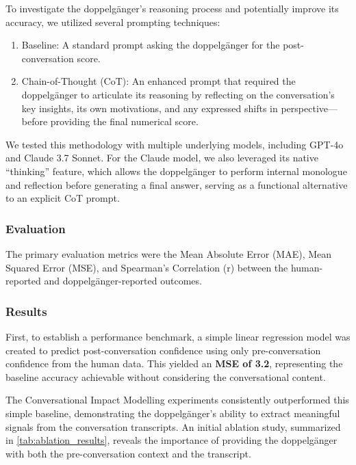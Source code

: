 To investigate the doppelgänger's reasoning process and potentially improve its accuracy, we utilized several prompting techniques:

\begin{enumerate}
\item Baseline: A standard prompt asking the doppelgänger for the post-conversation score.

\item Chain-of-Thought (CoT): An enhanced prompt that required the doppelgänger to articulate its reasoning by reflecting on the conversation's key insights, its own motivations, and any expressed shifts in perspective—before providing the final numerical score.
\end{enumerate}

We tested this methodology with multiple underlying models, including GPT-4o and Claude 3.7 Sonnet. For the Claude model, we also leveraged its native ``thinking'' feature, which allows the doppelgänger to perform internal monologue and reflection before generating a final answer, serving as a functional alternative to an explicit CoT prompt.

\subsubsection{Evaluation}
The primary evaluation metrics were the Mean Absolute Error (MAE), Mean Squared Error (MSE), and Spearman's Correlation (r) between the human-reported and doppelgänger-reported outcomes.

\subsubsection{Results}
First, to establish a performance benchmark, a simple linear regression model was created to predict post-conversation confidence using only pre-conversation confidence from the human data. This yielded an \textbf{MSE of 3.2}, representing the baseline accuracy achievable without considering the conversational content.

The Conversational Impact Modelling experiments consistently outperformed this simple baseline, demonstrating the doppelgänger's ability to extract meaningful signals from the conversation transcripts. An initial ablation study, summarized in \cref{tab:ablation_results}, reveals the importance of providing the doppelgänger with both the pre-conversation context and the transcript.



